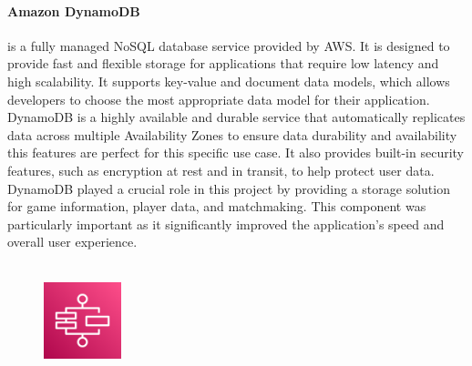 \documentclass[a4paper,12pt]{report}
\begin{document}
\paragraph{Amazon DynamoDB} is a fully managed NoSQL database service provided by AWS. It is designed to provide fast and flexible storage for applications that require low latency and high scalability.  It supports key-value and document data models, which allows developers to choose the most appropriate data model for their application.\\
DynamoDB is a highly available and durable service that automatically replicates data across multiple Availability Zones to ensure data durability and availability this features are perfect for this specific use case. It also provides built-in security features, such as encryption at rest and in transit, to help protect user data.\\
DynamoDB played a crucial role in this project by providing a storage solution for game information, player data, and matchmaking. This component was particularly important as it significantly improved the application's speed and overall user experience.\\\\
%
%
%
\begin{figure}
  \centering
  \includegraphics[width=0.2\textwidth]{img/services/Step-Functions}
\end{figure}
%
\end{document}
